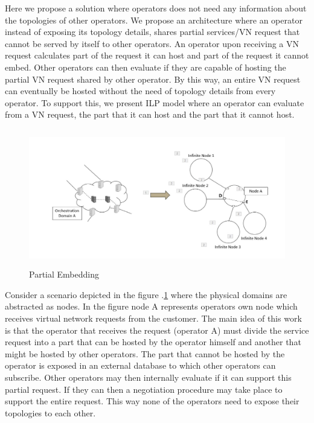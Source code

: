 \documentclass[article,dr=phil,type=msc ,colorback,accentcolor=tud4b]{tudthesis}
\begin{document}
Here we propose a solution where operators does not need any information about the topologies of other operators. We propose an architecture where an operator instead of exposing its topology details, shares partial services/VN request that cannot be served by itself to other operators. An operator upon receiving a VN request calculates part of the request it can host and part of the request it cannot embed. Other operators can then evaluate if they are capable of hosting the partial VN request shared by other operator. By this way, an entire VN request can eventually be hosted without the need of topology details from every operator. To support this, we present ILP model where an operator can evaluate from a VN request, the part that it can host and the part that it cannot host.
\begin{figure}[h]
	\centering
	\includegraphics[width=14cm, height=6cm]{Part_embed.jpg}
	\caption{Partial Embedding}
	\label{fig: Partial_Embedding}
\end{figure}

Consider a scenario depicted in the figure .\ref{fig: Partial_Embedding} where the physical domains are abstracted as nodes. In the figure node A represents operators own node which receives virtual network requests from the customer. The main idea of this work is that the operator that receives the request (operator A) must  divide the service request into a part that can be hosted by the operator himself and another that might be hosted by other  operators. The part that cannot be hosted by the operator is exposed in an external database to which other operators can subscribe. Other operators may then internally evaluate if it can support this partial request. If they can then a negotiation procedure may take place to support the entire request. This way none of the operators need to expose their topologies to each other.\newline
\end{document}

